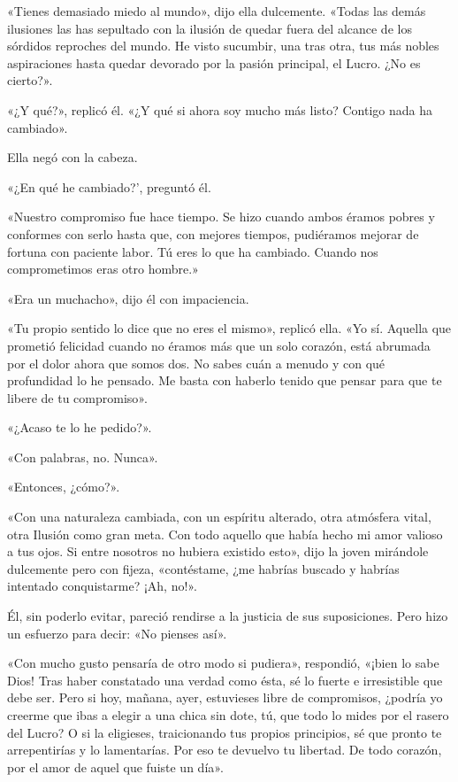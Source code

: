 \documentclass{novela}
\begin{document}
 «Tienes demasiado miedo al mundo», dijo ella dulcemente. «Todas las demás ilusiones las has sepultado con la ilusión de quedar fuera del alcance de los sórdidos reproches del mundo. He visto sucumbir, una tras otra, tus más nobles aspiraciones hasta quedar devorado por la pasión principal, el Lucro. ¿No es cierto?».

 «¿Y qué?», replicó él. «¿Y qué si ahora soy mucho más listo? Contigo nada ha cambiado».

 Ella negó con la cabeza.

 «¿En qué he cambiado?', preguntó él.

 «Nuestro compromiso fue hace tiempo. Se hizo cuando ambos éramos pobres y conformes con serlo hasta que, con mejores tiempos, pudiéramos mejorar de fortuna con paciente labor. Tú eres lo que ha cambiado. Cuando nos comprometimos eras otro hombre.»

 «Era un muchacho», dijo él con impaciencia.

 «Tu propio sentido lo dice que no eres el mismo», replicó ella. «Yo sí. Aquella que prometió felicidad cuando no éramos más que un solo corazón, está abrumada por el dolor ahora que somos dos. No sabes cuán a menudo y con qué profundidad lo he pensado. Me basta con haberlo tenido que pensar para que te libere de tu compromiso».

 «¿Acaso te lo he pedido?».

 «Con palabras, no. Nunca».

 «Entonces, ¿cómo?».

 «Con una naturaleza cambiada, con un espíritu alterado, otra atmósfera vital, otra Ilusión como gran meta. Con todo aquello que había hecho mi amor valioso a tus ojos. Si entre nosotros no hubiera existido esto», dijo la joven mirándole dulcemente pero con fijeza, «contéstame, ¿me habrías buscado y habrías intentado conquistarme? ¡Ah, no!».

 Él, sin poderlo evitar, pareció rendirse a la justicia de sus suposiciones. Pero hizo un esfuerzo para decir: «No pienses así».

 «Con mucho gusto pensaría de otro modo si pudiera», respondió, «¡bien lo sabe Dios! Tras haber constatado una verdad como ésta, sé lo fuerte e irresistible que debe ser. Pero si hoy, mañana, ayer, estuvieses libre de compromisos, ¿podría yo creerme que ibas a elegir a una chica sin dote, tú, que todo lo mides por el rasero del Lucro? O si la eligieses, traicionando tus propios principios, sé que pronto te arrepentirías y lo lamentarías. Por eso te devuelvo tu libertad. De todo corazón, por el amor de aquel que fuiste un día».
\end{document}
